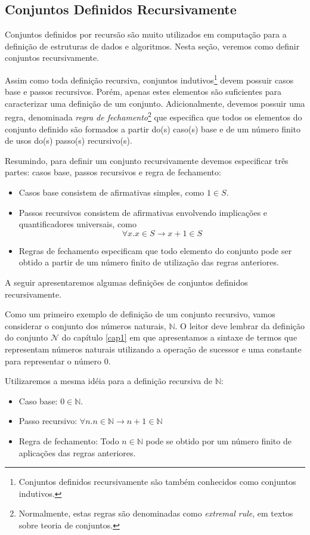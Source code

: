 \subsection{Conjuntos Definidos Recursivamente}

Conjuntos definidos por recursão são muito utilizados em computação
para a definição de estruturas de dados e algoritmos. Nesta seção,
veremos como definir conjuntos recursivamente.

Assim como toda definição recursiva, conjuntos
indutivos\footnote{Conjuntos definidos recursivamente são também conhecidos
  como conjuntos indutivos.} devem possuir casos base e passos
recursivos. Porém, apenas estes elementos são suficientes para
caracterizar uma definição de um conjunto. Adicionalmente, devemos
possuir uma regra, denominada \emph{regra de
  fechamento}\footnote{Normalmente, estas regras são denominadas como
  \emph{extremal rule}, em textos sobre teoria de conjuntos.} que
especifica que todos os elementos do conjunto definido são formados a
partir do(s) caso(s) base e de um número finito de usos do(s)
passo(s) recursivo(s).

Resumindo, para definir um conjunto recursivamente devemos especificar
três partes: casos base, passos recursivos e regra de fechamento:
\begin{itemize}
  \item Casos base consistem de afirmativas simples, como $1\in S$.
   \item Passos recursivos consistem de afirmativas envolvendo
     implicações e quantificadores universais, como \[\forall x. x\in
     S \to x + 1 \in S\]
   \item Regras de fechamento especificam que todo elemento do
     conjunto pode ser obtido a partir de um número finito de
     utilização das regras anteriores.
\end{itemize}

A seguir apresentaremos algumas definições de conjuntos definidos
recursivamente.

\begin{Example}
Como um primeiro exemplo de definição de um conjunto recursivo, vamos
considerar o conjunto dos números naturais,
$\mathbb{N}$. O leitor deve lembrar da definição do conjunto
$\mathcal{N}$ do capítulo \ref{cap1} em que apresentamos a sintaxe de
termos que representam números naturais utilizando a operação de
sucessor e uma constante para representar o número $0$.

Utilizaremos a
mesma idéia para a definição recursiva de $\mathbb{N}$:
\begin{itemize}
  \item Caso base: $0\in\mathbb{N}$.
  \item Passo recursivo: $\forall n. n\in\mathbb{N}\to n + 1 \in
    \mathbb{N}$
  \item Regra de fechamento: Todo $n\in\mathbb{N}$ pode se obtido por
    um número finito de aplicações das regras anteriores.
\end{itemize}
\end{Example}

